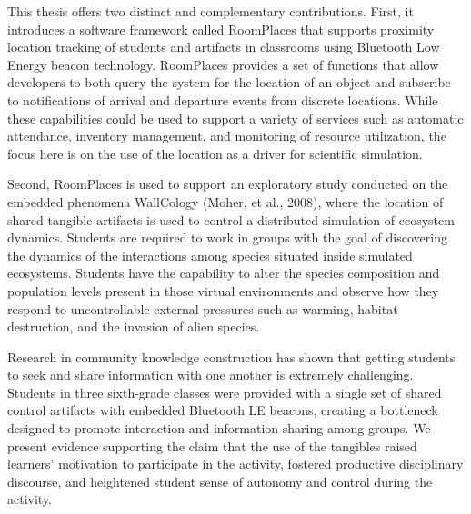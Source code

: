 \summary

\label{chap:summary}

This thesis offers two distinct and complementary contributions. First, it introduces a software framework called RoomPlaces that supports proximity location tracking of students and artifacts in classrooms using Bluetooth Low Energy beacon technology. RoomPlaces provides a set of functions that allow developers to both query the system for the location of an object and subscribe to notifications of arrival and departure events from discrete locations. While these capabilities could be used to support a variety of services such as automatic attendance, inventory management, and monitoring of resource utilization, the focus here is on the use of the location as a driver for scientific simulation. 

Second, RoomPlaces is used to support an exploratory study conducted on the embedded phenomena WallCology (Moher, et al., 2008), where the location of shared tangible artifacts is used to control a distributed simulation of ecosystem dynamics. Students are required to work in groups with the goal of discovering the dynamics of the interactions among species situated inside simulated ecosystems. Students have the capability to alter the species composition and population levels present in those virtual environments and observe how they respond to uncontrollable external pressures such as warming, habitat destruction, and the invasion of alien species.

Research in community knowledge construction has shown that getting students to seek and share information with one another is extremely challenging. Students in three sixth-grade classes were provided with a single set of shared control artifacts with embedded Bluetooth LE beacons, creating a bottleneck designed to promote interaction and information sharing among groups. We present evidence supporting the claim that the use of the tangibles raised learners' motivation to participate in the activity, fostered productive disciplinary discourse, and heightened student sense of autonomy and control during the activity.
